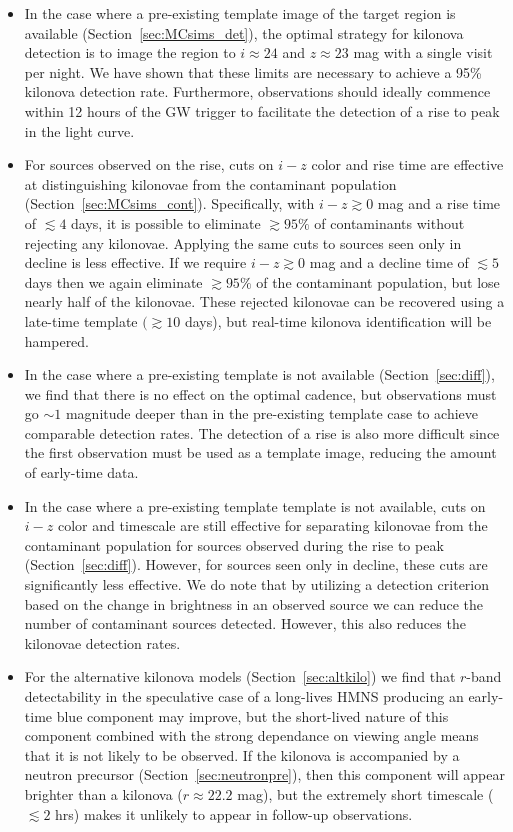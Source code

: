 \begin{itemize}
\item In the case where a pre-existing template image of the target region is available (Section~\ref{sec:MCsims_det}), the optimal strategy for kilonova detection is to image the region to $i\approx 24$ and $z\approx 23$ mag with a single visit per night. We have shown that these limits are necessary to achieve a 95\% kilonova detection rate. Furthermore, observations should ideally commence within 12 hours of the GW trigger to facilitate the detection of a rise to peak in the light curve. 
\item For sources observed on the rise, cuts on $i-z$ color and rise time are effective at distinguishing kilonovae from the contaminant population (Section~\ref{sec:MCsims_cont}). Specifically, with $i-z\gtrsim0$ mag and a rise time of $\lesssim 4$ days, it is possible to eliminate $\gtrsim95\%$ of contaminants without rejecting any kilonovae. Applying the same cuts to sources seen only in decline is less effective. If we require $i-z\gtrsim0$ mag and a decline time of $\lesssim5$ days then we again eliminate $\gtrsim95\%$ of the contaminant population, but lose nearly half of the kilonovae. These rejected kilonovae can be recovered using a late-time template $(\gtrsim10$ days), but real-time kilonova identification will be hampered.
\item In the case where a pre-existing template is not available (Section~\ref{sec:diff}), we find that there is no effect on the optimal cadence, but observations must go $\sim1$ magnitude deeper than in the pre-existing template case to achieve comparable detection rates. The detection of a rise is also more difficult since the first observation must be used as a template image, reducing the amount of early-time data.
\item In the case where a pre-existing template template is not available, cuts on $i-z$ color and timescale are still effective for separating kilonovae from the contaminant population for sources observed during the rise to peak (Section~\ref{sec:diff}). However, for sources seen only in decline, these cuts are significantly less effective. We do note that by utilizing a detection criterion based on the change in brightness in an observed source we can reduce the number of contaminant sources detected. However, this also reduces the kilonovae detection rates. 
\item For the alternative kilonova models (Section~\ref{sec:altkilo}) we find that $r$-band detectability in the speculative case of a long-lives HMNS producing an early-time blue component may improve, but the short-lived nature of this component combined with the strong dependance on viewing angle means that it is not likely to be observed. If the kilonova is accompanied by a neutron precursor (Section~\ref{sec:neutronpre}), then this component will appear brighter than a kilonova ($r\approx22.2$ mag), but the extremely short timescale ($\lesssim2$ hrs) makes it unlikely to appear in follow-up observations.

\end{itemize}
